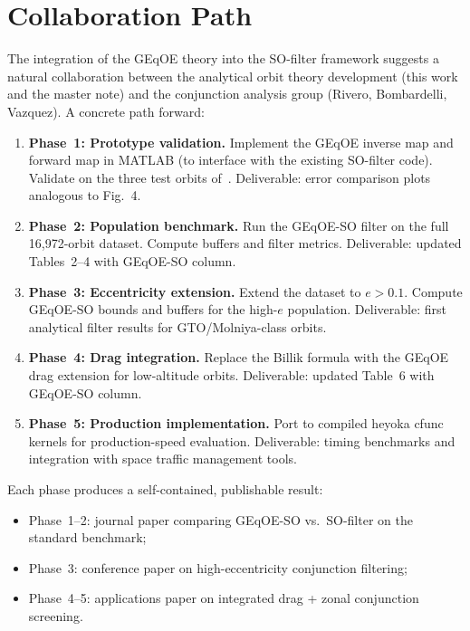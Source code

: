 \documentclass[11pt]{article}
\begin{document}
\section{Collaboration Path}
\label{sec:collaboration}

The integration of the GEqOE theory into the SO-filter framework suggests a
natural collaboration between the analytical orbit theory development (this
work and the master note) and the conjunction analysis group (Rivero,
Bombardelli, Vazquez). A concrete path forward:

\begin{enumerate}
\item \textbf{Phase~1: Prototype validation.} Implement the GEqOE inverse map
and forward map in MATLAB (to interface with the existing SO-filter code).
Validate on the three test orbits of~\cite{rivero2025}. Deliverable: error
comparison plots analogous to Fig.~4.

\item \textbf{Phase~2: Population benchmark.} Run the GEqOE-SO filter on the
full 16,972-orbit dataset. Compute buffers and filter metrics. Deliverable:
updated Tables~2--4 with GEqOE-SO column.

\item \textbf{Phase~3: Eccentricity extension.} Extend the dataset to
$e > 0.1$. Compute GEqOE-SO bounds and buffers for the high-$e$ population.
Deliverable: first analytical filter results for GTO/Molniya-class orbits.

\item \textbf{Phase~4: Drag integration.} Replace the Billik formula with
the GEqOE drag extension for low-altitude orbits. Deliverable: updated
Table~6 with GEqOE-SO column.

\item \textbf{Phase~5: Production implementation.} Port to compiled heyoka
cfunc kernels for production-speed evaluation. Deliverable: timing benchmarks
and integration with space traffic management tools.
\end{enumerate}

Each phase produces a self-contained, publishable result:
\begin{itemize}
\item Phase~1--2: journal paper comparing GEqOE-SO vs.\ SO-filter on the
standard benchmark;
\item Phase~3: conference paper on high-eccentricity conjunction filtering;
\item Phase~4--5: applications paper on integrated drag + zonal conjunction
screening.
\end{itemize}
\end{document}
